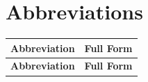 \chapter*{Abbreviations}

\renewcommand{\arraystretch}{1.25}

\begin{center}
\begin{longtable}{|p{1.4in}|p{4.1in}|}
\hline
\multicolumn{1}{|c|}{\textbf{Abbreviation}} &
\multicolumn{1}{c|}{\textbf{Full Form}}\\
\hline
\endfirsthead

\hline
\multicolumn{1}{|c|}{\textbf{Abbreviation}} &
\multicolumn{1}{c|}{\textbf{Full Form}}\\
\hline
\endhead


\end{longtable}
\end{center}
